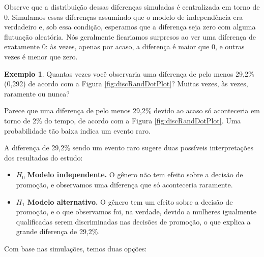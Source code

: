 \documentclass[
]{book}
\theoremstyle{definition}
\theoremstyle{definition}
\newtheorem{example}{Exemplo}[chapter]
\theoremstyle{definition}
\theoremstyle{definition}
\theoremstyle{remark}
\begin{document}
Observe que a distribuição dessas diferenças simuladas é centralizada em torno de 0. Simulamos essas diferenças assumindo que o modelo de independência era verdadeiro e, sob essa condição, esperamos que a diferença seja zero com alguma flutuação aleatória. Nós geralmente ficariamos surpresos ao ver uma diferença de exatamente 0: às vezes, apenas por acaso, a diferença é maior que 0, e outras vezes é menor que zero.

\begin{example}
\protect\hypertarget{exm:unnamed-chunk-42}{}{\label{exm:unnamed-chunk-42} }Quantas vezes você observaria uma diferença de pelo menos 29,2\% (0,292) de acordo com a Figura \ref{fig:discRandDotPlot}? Muitas vezes, às vezes, raramente ou nunca?
\end{example}

Parece que uma diferença de pelo menos 29,2\% devido ao acaso só aconteceria em torno de 2\% do tempo, de acordo com a Figura \ref{fig:discRandDotPlot}. Uma probabilidade tão baixa indica um evento raro.

A diferença de 29,2\% sendo um evento raro sugere duas possíveis interpretações dos resultados do estudo:

\begin{itemize}
\item
  \(H_0\) \textbf{Modelo independente.} O gênero não tem efeito sobre a decisão de promoção, e observamos uma diferença que só aconteceria raramente.
\item
  \(H_1\) \textbf{Modelo alternativo.} O gênero tem um efeito sobre a decisão de promoção, e o que observamos foi, na verdade, devido a mulheres igualmente qualificadas serem discriminadas nas decisões de promoção, o que explica a grande diferença de 29,2\%.
\end{itemize}

Com base nas simulações, temos duas opções:
\end{document}

